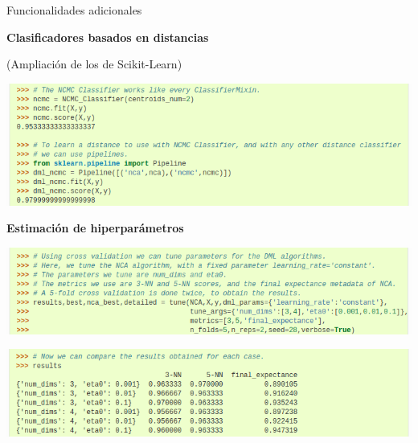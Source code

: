 \documentclass[10pt, compress]{beamer}
\begin{document}
\begin{frame}{Funcionalidades adicionales}
  \begin{minipage}[t]{0.48\textwidth}
  \begin{center}\textbf{Clasificadores basados en distancias}\end{center}
  \begin{center}(Ampliación de los de Scikit-Learn)\end{center}
      \centering\includegraphics[width=\textwidth]{images/ex_ncmc.png}
  \end{minipage}
  \hfill
  \begin{minipage}[t]{0.48\textwidth}
      \begin{center}\textbf{Estimación de hiperparámetros}\end{center}
      \centering\includegraphics[width=\textwidth]{images/ex_tune1.png}

      \centering\includegraphics[width=\textwidth]{images/ex_tune2.png}
  \end{minipage}
\end{frame}
\end{document}
